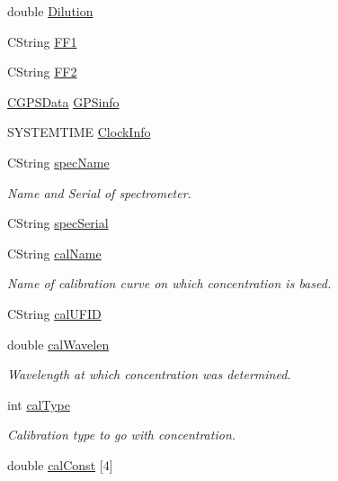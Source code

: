 \begin{DoxyCompactItemize}
\item 
double \hyperlink{classCSpectrumData_ad4ff25d2211aa22c4d4d1de8c7a99603}{Dilution}
\item 
CString \hyperlink{classCSpectrumData_aabb7452fb1af9ea7e42efc17f40ab7ba}{FF1}
\item 
CString \hyperlink{classCSpectrumData_a44761d78a03f7d746abdef5403627049}{FF2}
\item 
\hyperlink{classCGPSData}{CGPSData} \hyperlink{classCSpectrumData_a9adf14d430b7b5ea5f6aebf1f4559f92}{GPSinfo}
\item 
SYSTEMTIME \hyperlink{classCSpectrumData_a5fc9566fc8888bedb1f5df2872834ab7}{ClockInfo}
\item 
CString \hyperlink{classCSpectrumData_a8adfb78843d111e807db93f139781b26}{specName}
\begin{DoxyCompactList}\small\item\em Name and Serial of spectrometer. \item\end{DoxyCompactList}\item 
CString \hyperlink{classCSpectrumData_a4698c08da29550d0ebd9c17bf980b6bf}{specSerial}
\item 
CString \hyperlink{classCSpectrumData_ae0b7b8c53e009ebfa03064018be3884c}{calName}
\begin{DoxyCompactList}\small\item\em Name of calibration curve on which concentration is based. \item\end{DoxyCompactList}\item 
CString \hyperlink{classCSpectrumData_a1fedda1f4c474b8e399bc0390bffab48}{calUFID}
\item 
double \hyperlink{classCSpectrumData_a0592a6aabad34a9107497426dae8c83c}{calWavelen}
\begin{DoxyCompactList}\small\item\em Wavelength at which concentration was determined. \item\end{DoxyCompactList}\item 
int \hyperlink{classCSpectrumData_ab7bf1eda2ea2df43a5fa771b24bb18c8}{calType}
\begin{DoxyCompactList}\small\item\em Calibration type to go with concentration. \item\end{DoxyCompactList}\item 
double \hyperlink{classCSpectrumData_aeb037dca76271fed78e56d2a770839ec}{calConst} \mbox{[}4\mbox{]}

\end{DoxyCompactItemize}

